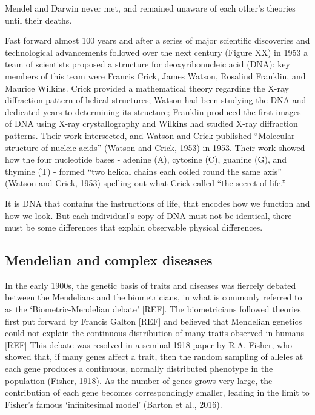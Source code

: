 Mendel and Darwin never met, and remained unaware of each other’s theories until their deaths. 

Fast forward almost 100 years and after a series of major scientific discoveries and technological advancements followed over the next century (Figure XX) in 1953 a team of scientists proposed a structure for deoxyribonucleic acid (DNA): key members of this team were Francis Crick, James Watson, Rosalind Franklin, and Maurice Wilkins. Crick provided a mathematical theory regarding the X-ray diffraction pattern of helical structures; Watson had been studying the DNA and dedicated years to determining its structure; Franklin produced the first images of DNA using X-ray crystallography and Wilkins had studied X-ray diffraction patterns. Their work intersected, and Watson and Crick published “Molecular structure of nucleic acids” (Watson and Crick, 1953) in 1953. Their work showed how the four nucleotide bases - adenine (A), cytosine (C), guanine (G), and thymine (T) - formed “two helical chains each coiled round the same axis” (Watson and Crick, 1953) spelling out what Crick called “the secret of life.”

It is DNA that contains the instructions of life, that encodes how we function and how we look. But each individual’s copy of DNA must not be identical, there must be some differences that explain observable physical differences. 

\subsection{Mendelian and complex diseases} %

In the early 1900s, the genetic basis of traits and diseases was fiercely debated between the Mendelians and the biometricians, in what is commonly referred to as the ‘Biometric-Mendelian debate’ [REF]. The biometricians followed theories first put forward by Francis Galton [REF] and believed that Mendelian genetics could not explain the continuous distribution of many traits observed in humans [REF] 
This debate was resolved in a seminal 1918 paper by R.A. Fisher, who showed that, if many genes affect a trait, then the random sampling of alleles at each gene produces a continuous, normally distributed phenotype in the population (Fisher, 1918). As the number of genes grows very large, the contribution of each gene becomes correspondingly smaller, leading in the limit to Fisher’s famous ‘infinitesimal model’ (Barton et al., 2016).

